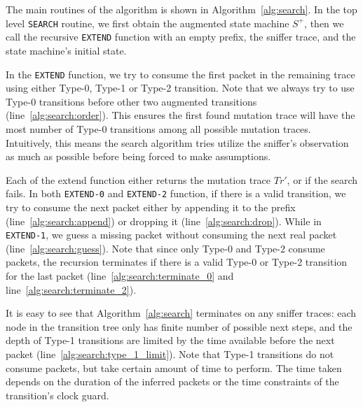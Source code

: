 The main routines of the algorithm is shown in Algorithm~\ref{alg:search}.
%
In the top level \texttt{SEARCH} routine, we first obtain the augmented state
machine $S^+$, then we call the recursive \texttt{EXTEND} function with an empty
prefix, the sniffer trace, and the state machine's initial state.

In the \texttt{EXTEND} function, we try to consume the first packet in the
remaining trace using either Type-0, Type-1 or Type-2 transition.
%
Note that we
always try to use Type-0 transitions before other two augmented transitions
(line~\ref{alg:search:order}).
%
This ensures the first found mutation trace will have the most number of Type-0
transitions among all possible mutation traces.
%
Intuitively, this means the search algorithm tries utilize the sniffer's
observation as much as possible before being forced to make assumptions.


Each of the extend function either returns the mutation trace $Tr'$, or
\textit{\nil} if the search fails.
%
In both \texttt{EXTEND-0} and
\texttt{EXTEND-2} function, if there is a valid transition, we try to consume
the next packet either by appending it to the prefix
(line~\ref{alg:search:append}) or dropping it (line~\ref{alg:search:drop}).
%
While in \texttt{EXTEND-1}, we guess a missing packet without consuming the next
real packet (line~\ref{alg:search:guess}).
%
Note that since only Type-0 and Type-2 consume packets, the recursion terminates
if there is a valid Type-0 or Type-2 transition for the last packet
(line~\ref{alg:search:terminate_0} and line~\ref{alg:search:terminate_2}).



It is easy to see that Algorithm~\ref{alg:search} terminates on any sniffer
traces: each node in the transition tree only has finite number of possible next
steps, and the depth of Type-1 transitions are limited by the time available
before the next packet (line~\ref{alg:search:type_1_limit}).
%
Note that Type-1
transitions do not consume packets, but take certain amount of time to perform.
%
The time taken depends on the duration of the inferred packets or the time
constraints of the transition's clock guard.
